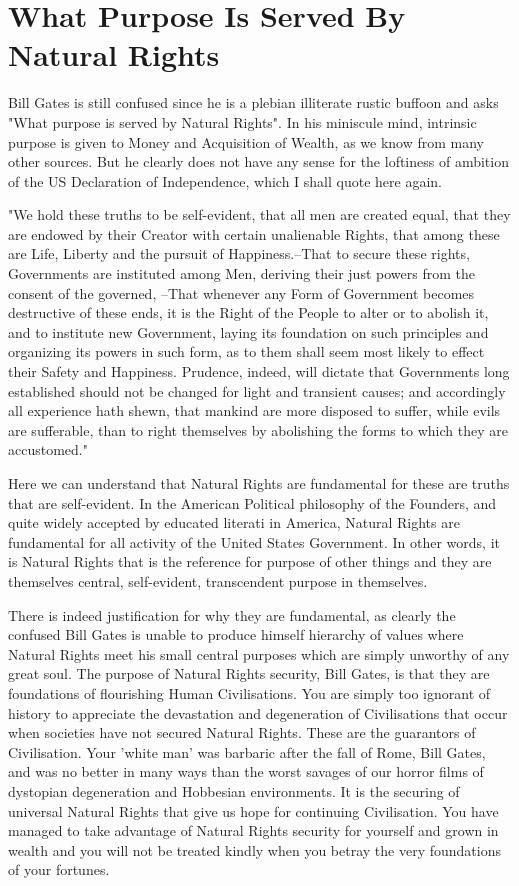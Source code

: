 \documentclass{amsart}
\begin{document}
\section{What Purpose Is Served By Natural Rights}

Bill Gates is still confused since he is a plebian illiterate rustic buffoon and asks "What purpose is served by Natural Rights".  In his miniscule mind, intrinsic purpose is given to Money and Acquisition of Wealth, as we know from many other sources.  But he clearly does not have any sense for the loftiness of ambition of the US Declaration of Independence, which I shall quote here again.

"We hold these truths to be self-evident, that all men are created equal, that they are endowed by their Creator with certain unalienable Rights, that among these are Life, Liberty and the pursuit of Happiness.--That to secure these rights, Governments are instituted among Men, deriving their just powers from the consent of the governed, --That whenever any Form of Government becomes destructive of these ends, it is the Right of the People to alter or to abolish it, and to institute new Government, laying its foundation on such principles and organizing its powers in such form, as to them shall seem most likely to effect their Safety and Happiness. Prudence, indeed, will dictate that Governments long established should not be changed for light and transient causes; and accordingly all experience hath shewn, that mankind are more disposed to suffer, while evils are sufferable, than to right themselves by abolishing the forms to which they are accustomed."

Here we can understand that Natural Rights are fundamental for these are truths that are self-evident.  In the American Political philosophy of the Founders, and quite widely accepted by educated literati in America, Natural Rights are fundamental for all activity of the United States Government.  In other words, it is Natural Rights that is the reference for purpose of other things and they are themselves central, self-evident, transcendent purpose in themselves.

There is indeed justification for why they are fundamental, as clearly the confused Bill Gates is unable to produce himself hierarchy of values where Natural Rights meet his small central purposes which are simply unworthy of any great soul.  The purpose of Natural Rights security, Bill Gates, is that they are foundations of flourishing Human Civilisations.  You are simply too ignorant of history to appreciate the devastation and degeneration of Civilisations that occur when societies have not secured Natural Rights.  These are the guarantors of Civilisation.  Your 'white man' was barbaric after the fall of Rome, Bill Gates, and was no better in many ways than the worst savages of our horror films of dystopian degeneration and Hobbesian environments.  It is the securing of universal Natural Rights that give us hope for continuing Civilisation.  You have managed to take advantage of Natural Rights security for yourself and grown in wealth and you will not be treated kindly when you betray the very foundations of your fortunes.  
\end{document}
